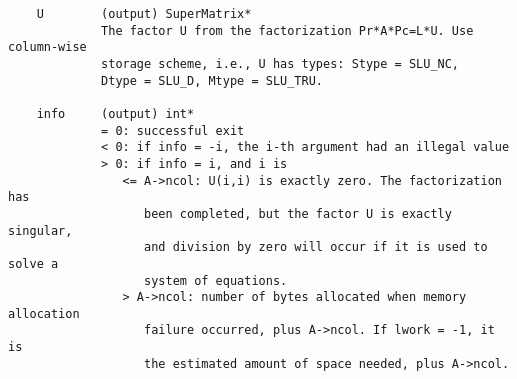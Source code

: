 \begin{verbatim}
    U        (output) SuperMatrix*
             The factor U from the factorization Pr*A*Pc=L*U. Use column-wise
             storage scheme, i.e., U has types: Stype = SLU_NC, 
             Dtype = SLU_D, Mtype = SLU_TRU.
   
    info     (output) int*
             = 0: successful exit
             < 0: if info = -i, the i-th argument had an illegal value
             > 0: if info = i, and i is
                <= A->ncol: U(i,i) is exactly zero. The factorization has
                   been completed, but the factor U is exactly singular,
                   and division by zero will occur if it is used to solve a
                   system of equations.
                > A->ncol: number of bytes allocated when memory allocation
                   failure occurred, plus A->ncol. If lwork = -1, it is
                   the estimated amount of space needed, plus A->ncol.
   
\end{verbatim}

